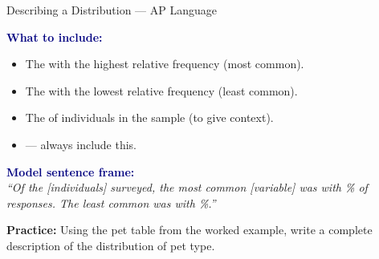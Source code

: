 \documentclass[10pt]{article}
\begin{document}
\begin{notesbox}{Describing a Distribution --- AP Language}
\small
\begin{multicols}{2}

\textbf{\textcolor{navy}{What to include:}}
\begin{itemize}[itemsep=3pt]
  \item The \blank{2cm} with the highest relative frequency (most common).
  \item The \blank{2cm} with the lowest relative frequency (least common).
  \item The \blank{2cm} of individuals in the sample (to give context).
  \item \blank{2.5cm} --- always include this.
\end{itemize}

\columnbreak

\textbf{\textcolor{navy}{Model sentence frame:}}\\[4pt]
\textit{``Of the \blank{1.5cm} [individuals] surveyed, the most common
[variable] was \blank{2cm} with \blank{1.5cm}\% of responses.
The least common was \blank{2cm} with \blank{1.5cm}\%.''}

\end{multicols}

\vspace{6pt}

\textbf{Practice:} Using the pet table from the worked example, write a complete
description of the distribution of pet type.\\[6pt]
\writeline\\[1pt]\writeline\\[1pt]\writeline

\end{notesbox}

\vspace{0.1in}
\end{document}
